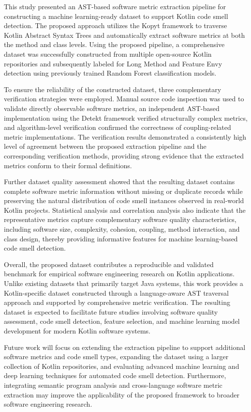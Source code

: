 \documentclass[]{einformatica}
\begin{document}
This study presented an AST-based software metric extraction pipeline for constructing a machine learning-ready dataset to support Kotlin code smell detection. The proposed approach utilizes the Kopyt framework to traverse Kotlin Abstract Syntax Trees and automatically extract software metrics at both the method and class levels. Using the proposed pipeline, a comprehensive dataset was successfully constructed from multiple open-source Kotlin repositories and subsequently labeled for Long Method and Feature Envy detection using previously trained Random Forest classification models.

To ensure the reliability of the constructed dataset, three complementary verification strategies were employed. Manual source code inspection was used to validate directly observable software metrics, an independent AST-based implementation using the Detekt framework verified structurally complex metrics, and algorithm-level verification confirmed the correctness of coupling-related metric implementations. The verification results demonstrated a consistently high level of agreement between the proposed extraction pipeline and the corresponding verification methods, providing strong evidence that the extracted metrics conform to their formal definitions.

Further dataset quality assessment showed that the resulting dataset contains complete software metric information without missing or duplicate records while preserving the natural distribution of code smell instances observed in real-world Kotlin projects. Statistical analysis and correlation analysis also indicate that the representative metrics capture complementary software quality characteristics, including software size, complexity, cohesion, coupling, method interaction, and class design, thereby providing informative features for machine learning-based code smell detection.

Overall, the proposed dataset contributes a reproducible and validated benchmark for empirical software engineering research on Kotlin applications. Unlike existing datasets that primarily target Java systems, this work provides a Kotlin-specific dataset constructed through a language-aware AST traversal approach and supported by comprehensive metric verification. The resulting dataset is expected to facilitate future studies involving software quality assessment, code smell detection, feature selection, and machine learning model development for modern Kotlin software systems.

Future work will focus on extending the extraction pipeline to support additional software metrics and code smell types, expanding the dataset using a larger collection of Kotlin repositories, and evaluating advanced machine learning and deep learning techniques for automated code smell detection. Furthermore, integrating semantic program analysis and cross-language software metric extraction may improve the applicability of the proposed framework to broader software engineering research.
\end{document}
